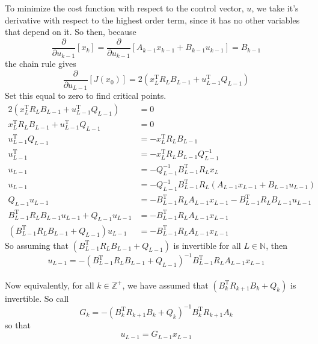 \documentclass{article}
\begin{document}
To minimize the cost function with respect to the control vector, $u$, we take it's derivative with respect to the highest order term, since it has no other variables that depend on it. So then, because
\[ \frac{\partial}{\partial u_{k-1}} \left[ x_{k} \right] = \frac{\partial}{\partial u_{k-1}} \left[ A_{k-1}x_{k-1} + B_{k-1}u_{k-1} \right] = B_{k-1} \]
the chain rule gives
\[ \frac{\partial}{\partial u_{L-1}} \left[ J(x_{0}) \right] = 2 \left( x_{L}^{\text{T}}R_{L}B_{L-1} + u_{L-1}^{\text{T}}Q_{L-1} \right) \]
Set this equal to zero to find critical points.
\begin{align*}
2 \left( x_{L}^{\text{T}}R_{L}B_{L-1} + u_{L-1}^{\text{T}}Q_{L-1} \right) &= 0 \\
x_{L}^{\text{T}}R_{L}B_{L-1} + u_{L-1}^{\text{T}}Q_{L-1} &= 0 \\
u_{L-1}^{\text{T}}Q_{L-1} &= -x_{L}^{\text{T}}R_{L}B_{L-1} \\
u_{L-1}^{\text{T}} &= -x_{L}^{\text{T}}R_{L}B_{L-1}Q_{L-1}^{-1} \\
u_{L-1} &= -Q_{L-1}^{-1} B_{L-1}^{\text{T}} R_{L} x_{L} \\
u_{L-1} &= -Q_{L-1}^{-1} B_{L-1}^{\text{T}} R_{L} \left( A_{L-1}x_{L-1} + B_{L-1}u_{L-1} \right) \\
Q_{L-1}u_{L-1} &= -B_{L-1}^{\text{T}} R_{L} A_{L-1} x_{L-1} - B_{L-1}^{\text{T}} R_{L} B_{L-1} u_{L-1} \\
B_{L-1}^{\text{T}} R_{L} B_{L-1} u_{L-1} + Q_{L-1}u_{L-1} &= -B_{L-1}^{\text{T}} R_{L} A_{L-1} x_{L-1} \\
\left( B_{L-1}^{\text{T}} R_{L} B_{L-1} + Q_{L-1} \right) u_{L-1} &= -B_{L-1}^{\text{T}} R_{L} A_{L-1} x_{L-1}
\end{align*}
So assuming that $\left( B_{L-1}^{\text{T}} R_{L} B_{L-1} + Q_{L-1} \right)$ is invertible for all $L\in\mathbb{N}$, then
\[ \boxed{u_{L-1} = -\left( B_{L-1}^{\text{T}} R_{L} B_{L-1} + Q_{L-1} \right)^{-1} B_{L-1}^{\text{T}} R_{L} A_{L-1} x_{L-1}} \]

\paragraph{}
Now equivalently, for all $k\in\mathbb{Z}^{+}$, we have assumed that $\left( B_{k}^{\text{T}} R_{k+1} B_{k} + Q_{k} \right)$ is invertible. So call 
\[ \boxed{G_{k} = -\left( B_{k}^{\text{T}} R_{k+1} B_{k} + Q_{k} \right)^{-1} B_{k}^{\text{T}} R_{k+1} A_{k}} \]
so that
\[ \boxed{ u_{L-1} = G_{L-1} x_{L-1} }  \]
\end{document}
